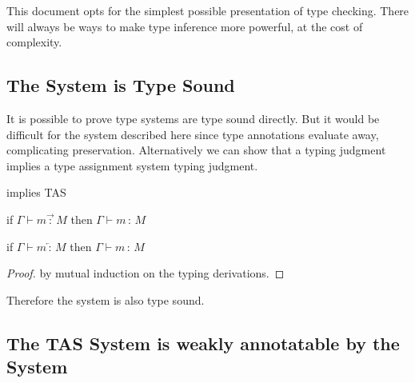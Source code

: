 
This document opts for the simplest possible presentation of \bidir{} type checking.
There will always be ways to make type inference more powerful, at the cost of complexity.

\subsection{The \Bidir{} System is Type Sound}

It is possible to prove \bidir{} type systems are type sound directly\cite{nanevski2005dependent}.
But it would be difficult for the system described here since type annotations evaluate away, complicating preservation.
Alternatively we can show that a \bidir{} typing judgment implies a type assignment system typing judgment.

\begin{thm}
\Bidir{} implies \ac{TAS}

if $\Gamma\vdash m\overrightarrow{\,:\,}M$ then $\Gamma\vdash m\,:\,M$

if $\Gamma\vdash m\overleftarrow{\,:\,}M$ then $\Gamma\vdash m\,:\,M$
\end{thm}

\begin{proof}
by mutual induction on the \bidir{} typing derivations.
\end{proof}
Therefore the \bidir{} system is also type sound.

\subsection{The \ac{TAS} System is weakly annotatable by the \Bidir{} System}

